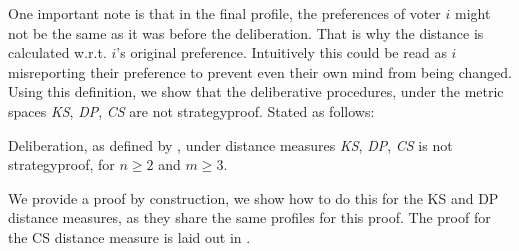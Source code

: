 One important note is that in the final profile, the
preferences of voter \(i\) might not be the same as it was
before the deliberation. That is why the distance is calculated
w.r.t. \(i\)'s original preference. Intuitively this could be
read as \(i\) misreporting their preference to prevent even
their own mind from being changed. Using this definition, we
show that the deliberative procedures, under the metric spaces
\emph{KS}, \emph{ DP}, \emph{ CS} are not strategyproof. Stated
as follows:

\begin{proposition}
	\label{prop:rad_roy_delib}
	Deliberation, as defined by
	\citet{radDeliberationSinglePeakednessCoherent2021}, under distance
	measures \emph{KS}, \emph{ DP}, \emph{ CS} is not strategyproof, for $n
		\geq 2$ and $m \geq 3$.
\end{proposition}

We provide a proof by construction, we show how to do this for
the KS and DP distance measures, as they share the same profiles for this proof. The
proof for the CS distance measure is laid out in .

